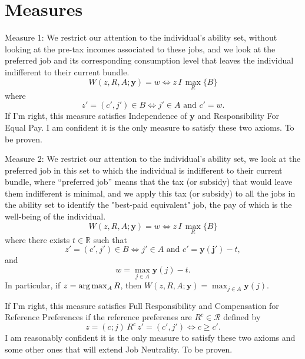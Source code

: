 \section{Measures}

Measure 1: We restrict our attention to the individual's ability set, without looking at the pre-tax incomes associated to these jobs, and we look at the preferred job and its corresponding consumption level that leaves the individual indifferent to their current bundle.
\begin{equation*}
\label{ }
W(z, R, A;\mathbf{y})=w\Leftrightarrow z\,I\,\max_R\{B\}
\end{equation*}
where
\begin{equation*}
\label{ }
z'=(c',j')\in B\Leftrightarrow j'\in A \textrm{ and } c'=w.
\end{equation*}
If I'm right, this measure satisfies Independence of $\mathbf{y}$ and Responsibility For Equal Pay. I am confident it is the only measure to satisfy these two axioms. To be proven.

Measure 2: We restrict our attention to the individual's ability set, we look at the preferred job in this set to which the individual is indifferent to their current bundle, where ``preferred job'' means that the tax (or subsidy) that would leave them indifferent is minimal, and we apply this tax (or subsidy) to all the jobs in the ability set to identify the "best-paid equivalent" job, the pay of which is the well-being of the individual.
\begin{equation*}
\label{ }
W(z, R, A;\mathbf{y})=w\Leftrightarrow z\,I\,\max_R\{B\}
\end{equation*}
where there exists $t\in\mathbb{R}$ such that 
\begin{equation*}
\label{ }
z'=(c',j')\in B\Leftrightarrow j'\in A \textrm{ and } c'=\mathbf{y(j')}-t,
\end{equation*}
and 
\begin{equation*}
\label{ }
w=\max_{j\in A}\mathbf{y}(j)-t.
\end{equation*}
In particular, if $z=\operatorname*{arg\,max}_A R$, then $W(z, R, A;\mathbf{y})=\max_{j\in A}\mathbf{y}(j)$.

If I'm right, this measure satisfies Full Responsibility and Compensation for Reference Preferences if the reference preferenes are $R^{c}\in\mathcal{R}$ defined by 
\begin{equation*}
\label{ }
z=(c;j)\,R^{c}\,z'=(c',j')\Leftrightarrow c\geq c'.
\end{equation*} 
I am reasonably confident it is the only measure to satisfy these two axioms and some other ones that will extend Job Neutrality. To be proven.

